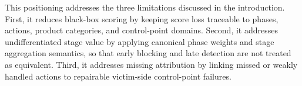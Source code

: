 This positioning addresses the three limitations discussed in the introduction. First, it reduces black-box scoring by keeping score loss traceable to phases, actions, product categories, and control-point domains. Second, it addresses undifferentiated stage value by applying canonical phase weights and stage aggregation semantics, so that early blocking and late detection are not treated as equivalent. Third, it addresses missing attribution by linking missed or weakly handled actions to repairable victim-side control-point failures.

